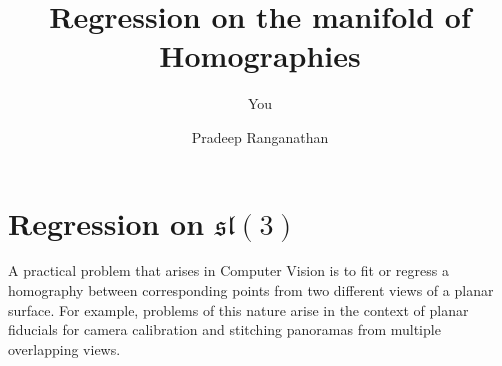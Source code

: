 \documentclass{article}
\title{Regression on the manifold of Homographies}
\author{You}
\begin{document}
\author{Pradeep Ranganathan}
\maketitle




\section{Regression on \(\mathfrak{sl}(3)\)}

A practical problem that arises in Computer Vision is to fit or regress a homography between corresponding points from two different views of a planar surface. For example, problems of this nature arise in the context of planar fiducials for camera calibration and stitching panoramas from multiple overlapping views.

\vspace*{0.5in}
\noindent{}






\end{document}
